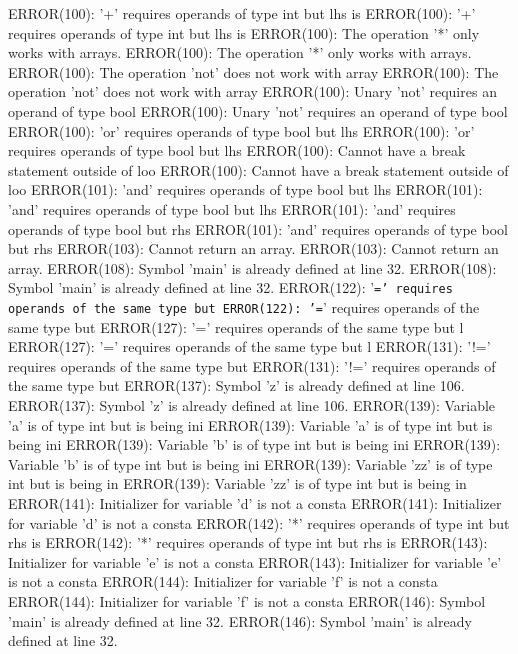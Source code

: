 \documentclass[12pt]{book}
\begin{document}
ERROR(100): '+' requires operands of type int but lhs is        ERROR(100): '+' requires operands of type int but lhs is
ERROR(100): The operation '*' only works with arrays.                ERROR(100): The operation '*' only works with arrays.
ERROR(100): The operation 'not' does not work with array        ERROR(100): The operation 'not' does not work with array
ERROR(100): Unary 'not' requires an operand of type bool        ERROR(100): Unary 'not' requires an operand of type bool
ERROR(100): 'or' requires operands of type bool but lhs         ERROR(100): 'or' requires operands of type bool but lhs 
ERROR(100): Cannot have a break statement outside of loo        ERROR(100): Cannot have a break statement outside of loo
ERROR(101): 'and' requires operands of type bool but lhs        ERROR(101): 'and' requires operands of type bool but lhs
ERROR(101): 'and' requires operands of type bool but rhs        ERROR(101): 'and' requires operands of type bool but rhs
ERROR(103): Cannot return an array.                                ERROR(103): Cannot return an array.
ERROR(108): Symbol 'main' is already defined at line 32.        ERROR(108): Symbol 'main' is already defined at line 32.
ERROR(122): '\texttt{=' requires operands of the same type but 	ERROR(122): '=}' requires operands of the same type but 
ERROR(127): '=' requires operands of the same type but l        ERROR(127): '=' requires operands of the same type but l
ERROR(131): '!=' requires operands of the same type but         ERROR(131): '!=' requires operands of the same type but 
ERROR(137): Symbol 'z' is already defined at line 106.                ERROR(137): Symbol 'z' is already defined at line 106.
ERROR(139): Variable 'a' is of type int but is being ini        ERROR(139): Variable 'a' is of type int but is being ini
ERROR(139): Variable 'b' is of type int but is being ini        ERROR(139): Variable 'b' is of type int but is being ini
ERROR(139): Variable 'zz' is of type int but is being in        ERROR(139): Variable 'zz' is of type int but is being in
ERROR(141): Initializer for variable 'd' is not a consta        ERROR(141): Initializer for variable 'd' is not a consta
ERROR(142): '*' requires operands of type int but rhs is        ERROR(142): '*' requires operands of type int but rhs is
ERROR(143): Initializer for variable 'e' is not a consta        ERROR(143): Initializer for variable 'e' is not a consta
ERROR(144): Initializer for variable 'f' is not a consta        ERROR(144): Initializer for variable 'f' is not a consta
ERROR(146): Symbol 'main' is already defined at line 32.        ERROR(146): Symbol 'main' is already defined at line 32.
\end{document}
